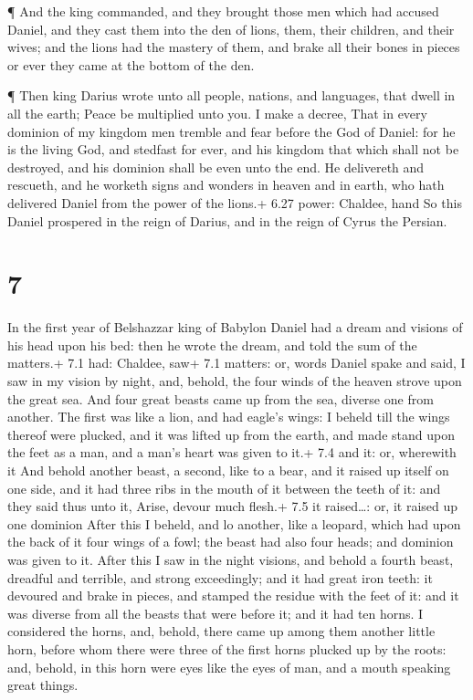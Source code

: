  ¶ And the king commanded, and they brought those men which
had accused Daniel, and they cast them into the den of lions, them,
their children, and their wives; and the lions had the mastery of them,
and brake all their bones in pieces or ever they came at the bottom of
the den.

 ¶ Then king Darius wrote unto all people, nations, and
languages, that dwell in all the earth; Peace be multiplied unto you.
 I make a decree, That in every dominion of my kingdom men
tremble and fear before the God of Daniel: for he is the living God, and
stedfast for ever, and his kingdom that which shall not be destroyed,
and his dominion shall be even unto the end.  He delivereth
and rescueth, and he worketh signs and wonders in heaven and in earth,
who hath delivered Daniel from the power of the lions.+ 6.27 power:
Chaldee, hand  So this Daniel prospered in the reign of
Darius, and in the reign of Cyrus the Persian.

\hypertarget{section-6}{%
\section{7}\label{section-6}}

 In the first year of Belshazzar king of Babylon Daniel had
a dream and visions of his head upon his bed: then he wrote the dream,
and told the sum of the matters.+ 7.1 had: Chaldee, saw+ 7.1 matters:
or, words  Daniel spake and said, I saw in my vision by
night, and, behold, the four winds of the heaven strove upon the great
sea.  And four great beasts came up from the sea, diverse
one from another.  The first was like a lion, and had
eagle's wings: I beheld till the wings thereof were plucked, and it was
lifted up from the earth, and made stand upon the feet as a man, and a
man's heart was given to it.+ 7.4 and it: or, wherewith it 
And behold another beast, a second, like to a bear, and it raised up
itself on one side, and it had three ribs in the mouth of it between the
teeth of it: and they said thus unto it, Arise, devour much flesh.+ 7.5
it raised\ldots: or, it raised up one dominion  After this I
beheld, and lo another, like a leopard, which had upon the back of it
four wings of a fowl; the beast had also four heads; and dominion was
given to it.  After this I saw in the night visions, and
behold a fourth beast, dreadful and terrible, and strong exceedingly;
and it had great iron teeth: it devoured and brake in pieces, and
stamped the residue with the feet of it: and it was diverse from all the
beasts that were before it; and it had ten horns.  I
considered the horns, and, behold, there came up among them another
little horn, before whom there were three of the first horns plucked up
by the roots: and, behold, in this horn were eyes like the eyes of man,
and a mouth speaking great things.

